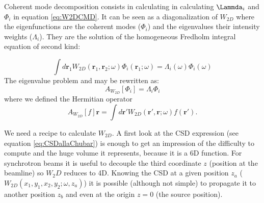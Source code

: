 \documentclass{iucr}              %
\begin{document}
Coherent mode decomposition consists in calculating in calculating $\Lammda_i$ and $\Phi_i$ in equation \ref{eq:W2DCMD}. It can be seen as a diagonalization of $W_{2D}$ where the eigenfunctions are the coherent modes ($\Phi_i$) and the eigenvalues their intensity weights ($\Lambda_i$). They are the solution of the homogeneous Fredholm integral equation of second kind:

\begin{equation}\label{fredholm_equation}
\int d\textbf{r}_1 W_{2D}(\textbf{r}_1,\textbf{r}_2;\omega)
\Phi_i(\textbf{r}_1;\omega) = \Lambda_i(\omega) \Phi_i(\omega)
\end{equation}
The eigenvalue problem and may be rewritten as:
\begin{equation}
A_{W_{2D}}[\Phi_i] = \Lambda_i \Phi_i
\end{equation}
where we defined the Hermitian operator
\begin{equation}
A_{W_{2D}}[f]\textbf{r}  = \int d\textbf{r}' W_{2D}(\textbf{r}',\textbf{r};\omega) f(\textbf{r}').
\end{equation}

We need a recipe to calculate $W_{2D}$. 
A first look at the CSD expression (see equation \ref{eq:CSDallaChubar}) is enough to get an impression of the difficulty to compute and the huge volume it represents, because it is a 6D function. For synchrotron beams it is useful to decouple the third coordinate $z$ (position at the beamline) so $W_2D$ reduces to 4D. Knowing the CSD at a given position $z_a$ ($W_{2D}(x_1,y_1,x_2,y_2; \omega, z_a)$) it is possible (although not simple) to propagate it to another position $z_b$ and even at the origin $z=0$ (the source position).
\end{document}
